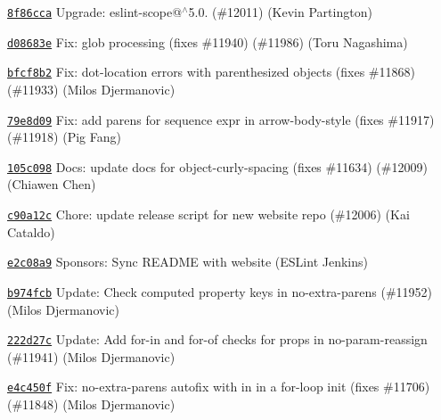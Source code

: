 \begin{DoxyItemize}
\item \href{https://github.com/eslint/eslint/commit/8f86ccaa89daf10123370868c5dcb48c1fcbef7d}{\texttt{ {\ttfamily 8f86cca}}} Upgrade\+: eslint-\/scope@\texorpdfstring{$^\wedge$}{\string^}5.0. (\#12011) (Kevin Partington)
\item \href{https://github.com/eslint/eslint/commit/d08683e3c807f92daf266894093c70f8d5ac6afa}{\texttt{ {\ttfamily d08683e}}} Fix\+: glob processing (fixes \#11940) (\#11986) (Toru Nagashima)
\item \href{https://github.com/eslint/eslint/commit/bfcf8b21011466b570b536ca31ec10fd228b3dca}{\texttt{ {\ttfamily bfcf8b2}}} Fix\+: dot-\/location errors with parenthesized objects (fixes \#11868) (\#11933) (Milos Djermanovic)
\item \href{https://github.com/eslint/eslint/commit/79e8d099bbbebfa4d804484eeeeea9c074ede870}{\texttt{ {\ttfamily 79e8d09}}} Fix\+: add parens for sequence expr in arrow-\/body-\/style (fixes \#11917) (\#11918) (Pig Fang)
\item \href{https://github.com/eslint/eslint/commit/105c098f3cece8b83ab8d1566b8ea41dd94a60b9}{\texttt{ {\ttfamily 105c098}}} Docs\+: update docs for object-\/curly-\/spacing (fixes \#11634) (\#12009) (Chiawen Chen)
\item \href{https://github.com/eslint/eslint/commit/c90a12c283698befcafd2c86f8bd8942428fe80b}{\texttt{ {\ttfamily c90a12c}}} Chore\+: update release script for new website repo (\#12006) (Kai Cataldo)
\item \href{https://github.com/eslint/eslint/commit/e2c08a9c8d86238955ecc8fd5a626584ee91eba5}{\texttt{ {\ttfamily e2c08a9}}} Sponsors\+: Sync README with website (ESLint Jenkins)
\item \href{https://github.com/eslint/eslint/commit/b974fcbd3321ab382a914520018d4c051b2e5c62}{\texttt{ {\ttfamily b974fcb}}} Update\+: Check computed property keys in no-\/extra-\/parens (\#11952) (Milos Djermanovic)
\item \href{https://github.com/eslint/eslint/commit/222d27c32a6d6d8828233b3b99e93ecefa94c603}{\texttt{ {\ttfamily 222d27c}}} Update\+: Add for-\/in and for-\/of checks for props in no-\/param-\/reassign (\#11941) (Milos Djermanovic)
\item \href{https://github.com/eslint/eslint/commit/e4c450febc9bd77b33f6473667afa9f955be6b71}{\texttt{ {\ttfamily e4c450f}}} Fix\+: no-\/extra-\/parens autofix with {\ttfamily in} in a for-\/loop init (fixes \#11706) (\#11848) (Milos Djermanovic)

\end{DoxyItemize}
